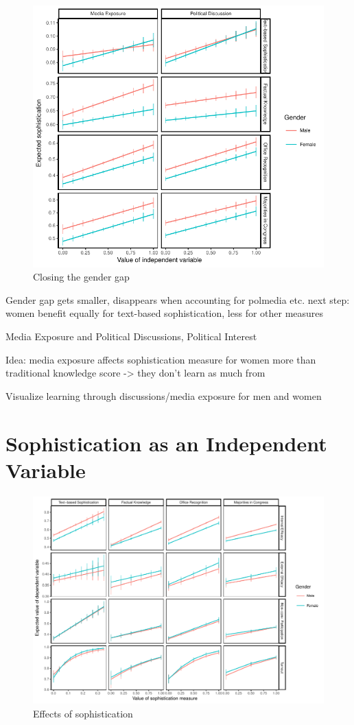\documentclass[12pt]{article}
\begin{document}
\begin{figure}[h]\centering
\includegraphics{../fig/closing.pdf}
\caption{Closing the gender gap}\label{fig:closing}
\end{figure}

Gender gap gets smaller, disappears when accounting for polmedia etc.
next step: women benefit equally for text-based sophistication, less for other measures



Media Exposure and Political Discussions, Political Interest

Idea: media exposure affects sophistication measure for women more than traditional knowledge score -> they don't learn as much from

Visualize learning through discussions/media exposure for men and women


\section*{Sophistication as an Independent Variable}

\begin{figure}[h]\centering
\includegraphics{../fig/sopheff.pdf}
\caption{Effects of sophistication}\label{fig:sopheff}
\end{figure}
\end{document}
